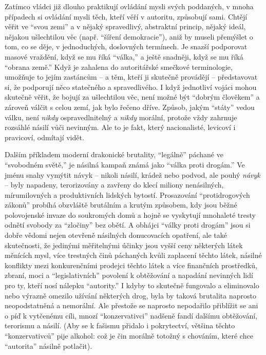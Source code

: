 \documentclass{book}
\begin{document}
Zatímco vládci již dlouho praktikují ovládání mysli svých poddaných, v mnoha případech si ovládání mysli těch, kteří věří v autoritu, způsobují sami. Chtějí věřit ve \enquote{svou zemi} a v nějaký spravedlivý, abstraktní princip, nějaký ideál, nějakou ušlechtilou věc (např. \enquote{šíření demokracie}), aniž by museli přemýšlet o tom, co se děje, v jednoduchých, doslovných termínech. Je snazší podporovat masové vraždění, když se mu říká \enquote{válka,} a ještě snadněji, když se mu říká \enquote{obrana země.} Když je zahalena do autoritářské smečkové terminologie, umožňuje to jejím zastáncům -- a těm, kteří ji skutečně provádějí -- představovat si, že podporují něco statečného a spravedlivého. I když jednotliví vojáci mohou skutečně věřit, že bojují za ušlechtilou věc, není možné být \enquote{dobrým člověkem} a zároveň válčit s celou zemí, jak bylo řečeno dříve. Způsob, jakým \enquote{státy} vedou válku, není \emph{nikdy} ospravedlnitelný a \emph{nikdy} morální, protože vždy zahrnuje rozsáhlé násilí vůči nevinným. Ale to je fakt, který nacionalisté, levicoví i pravicoví, odmítají vidět.

Dalším příkladem moderní drakonické brutality, \enquote{legálně} páchané ve \enquote{svobodném světě,} je násilná kampaň známá jako \enquote{válka proti drogám.} Ve jménu snahy vymýtit návyk -- nikoli násilí, krádež nebo podvod, ale pouhý \emph{návyk} -- byly napadeny, terorizovány a zavřeny do klecí miliony nenásilných, mírumilovných a produktivních lidských bytostí. Prosazování \enquote{protidrogových zákonů} probíhá obzvláště brutálním a krutým způsobem, kdy jsou běžné polovojenské invaze do soukromých domů a hojně se vyskytují mnohaleté tresty odnětí svobody za \enquote{zločiny} bez obětí. A obhájci \enquote{války proti drogám} jsou si dobře vědomi nejen otevřeně násilných donucovacích opatření, ale také skutečnosti, že jedinými měřitelnými účinky jsou vyšší ceny některých látek měnících mysl, více trestných činů páchaných kvůli zaplacení těchto látek, násilné konflikty mezi konkurenčními prodejci těchto látek a více finančních prostředků, zbraní, moci a \enquote{legislativních} povolení k obtěžování a napadání nevinných lidí pro ty, kteří nosí nálepku \enquote{autority.} I kdyby to skutečně fungovalo a eliminovalo nebo výrazně omezilo užívání některých drog, byla by taková brutalita naprosto neopodstatněná a nemorální. Ale přestože se naprosto nepodařilo přiblížit se ani o píď k vytčenému cíli, mnozí \enquote{konzervativci} nadšeně fandí dalšímu obtěžování, terorismu a násilí. (Aby se k fašismu přidalo i pokrytectví, většina těchto \enquote{konzervativců} pije alkohol: což je čin morálně totožný s chováním, které chce \enquote{autorita} násilně potlačit).
\end{document}
